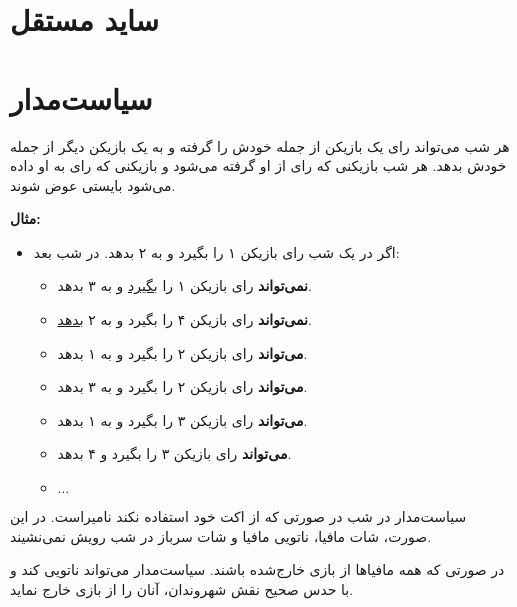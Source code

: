 \documentclass[12pt]{extarticle}
\begin{document}
\section*{ساید مستقل}
\section{سیاست‌مدار}
هر شب می‌تواند رای یک بازیکن از جمله خودش را گرفته و به یک بازیکن دیگر از جمله
خودش بدهد. هر شب بازیکنی که رای از او گرفته می‌شود و بازیکنی که رای به او داده می‌شود
بایستی عوض شوند.

\textbf{مثال:}
\begin{itemize}
	\item اگر در یک شب رای بازیکن ۱ را بگیرد و به ۲ بدهد. در شب بعد:
	      \begin{itemize}
		      \item \textbf{نمی‌تواند}
		            رای بازیکن ۱ را
		            \underline{بگیرد}
		            و به ۳ بدهد.
		      \item \textbf{نمی‌تواند} رای بازیکن ۴ را بگیرد و به ۲ \underline{بدهد}.
		      \item \textbf{می‌تواند} رای بازیکن ۲ را بگیرد و به ۱ بدهد.
		      \item
		            \textbf{می‌تواند}
		            رای بازیکن ۲ را بگیرد و به ۳ بدهد.
		      \item
		            \textbf{می‌تواند}
		            رای بازیکن ۳ را بگیرد و به ۱ بدهد.
		      \item
		            \textbf{می‌تواند}
		            رای بازیکن ۳ را بگیرد و ۴ بدهد.
		      \item
		            $\dots$
	      \end{itemize}
\end{itemize}

سیاست‌مدار در شب در صورتی که از اکت خود استفاده نکند
نامیراست. در این صورت، شات مافیا، ناتویی مافیا و شات سرباز در شب رویش
نمی‌نشیند.

در صورتی که همه مافیاها از بازی خارج‌شده باشند. سیاست‌مدار می‌تواند ناتویی کند
و با حدس صحیح نقش شهروندان، آنان را از بازی خارج نماید.



\clearpage
\end{document}

